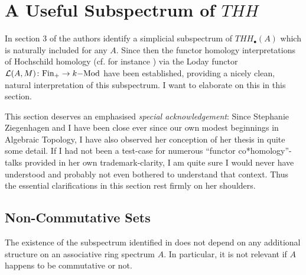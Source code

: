 {}

\section{A Useful Subspectrum of $THH$}
In section 3 of \cite{MS} the authors identify a simplicial subspectrum of
$THH_\bullet(A)$ which is naturally included for any $A$. Since then the
functor homology interpretations of Hochschild homology (cf. for instance
\cite{Loday,PRi}) via the Loday functor $\mathcal{L}(A,M)\colon \mathrm{Fin}_+\rightarrow 
k\mathrm{-Mod}$ have been established, providing a nicely clean, natural
interpretation of this subspectrum. I want to elaborate on this in this
section.

This section deserves an emphasised \emph{special 
acknowledgement}:
Since Stephanie Ziegenhagen and I have been close ever since our own
modest beginnings in Algebraic Topology, I have also observed her
conception of her thesis \cite{Z} in quite some detail. If I had not
been a test-case for numerous ``functor co*homology''-talks provided 
in her own trademark-clarity, I am quite sure I would never have 
understood and probably not even bothered to understand that context.
Thus the essential clarifications in this section rest firmly on her
shoulders.

\subsection*{Non-Commutative Sets}
The existence of the subspectrum identified in \cite[Section 3]{MS} 
does not depend on any additional structure on an associative ring 
spectrum $A$. In particular, it is not relevant if $A$ happens to be 
commutative or not. 

